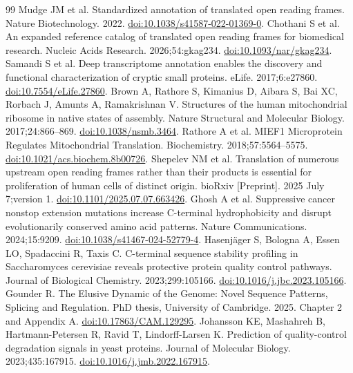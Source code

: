 \documentclass[11pt,a4paper]{article}
\begin{document}
\begingroup\small
\begin{thebibliography}{99}
 Mudge JM et al. Standardized annotation of translated open reading frames. Nature Biotechnology. 2022. \href{https://doi.org/10.1038/s41587-022-01369-0}{doi:10.1038/s41587-022-01369-0}.
 Chothani S et al. An expanded reference catalog of translated open reading frames for biomedical research. Nucleic Acids Research. 2026;54:gkag234. \href{https://doi.org/10.1093/nar/gkag234}{doi:10.1093/nar/gkag234}.
 Samandi S et al. Deep transcriptome annotation enables the discovery and functional characterization of cryptic small proteins. eLife. 2017;6:e27860. \href{https://doi.org/10.7554/eLife.27860}{doi:10.7554/eLife.27860}.
 Brown A, Rathore S, Kimanius D, Aibara S, Bai XC, Rorbach J, Amunts A, Ramakrishnan V. Structures of the human mitochondrial ribosome in native states of assembly. Nature Structural and Molecular Biology. 2017;24:866--869. \href{https://doi.org/10.1038/nsmb.3464}{doi:10.1038/nsmb.3464}.
 Rathore A et al. MIEF1 Microprotein Regulates Mitochondrial Translation. Biochemistry. 2018;57:5564--5575. \href{https://doi.org/10.1021/acs.biochem.8b00726}{doi:10.1021/acs.biochem.8b00726}.
 Shepelev NM et al. Translation of numerous upstream open reading frames rather than their products is essential for proliferation of human cells of distinct origin. bioRxiv [Preprint]. 2025 July 7;version 1. \href{https://doi.org/10.1101/2025.07.07.663426}{doi:10.1101/2025.07.07.663426}.
 Ghosh A et al. Suppressive cancer nonstop extension mutations increase C-terminal hydrophobicity and disrupt evolutionarily conserved amino acid patterns. Nature Communications. 2024;15:9209. \href{https://doi.org/10.1038/s41467-024-52779-4}{doi:10.1038/s41467-024-52779-4}.
 Hasenj{\"a}ger S, Bologna A, Essen LO, Spadaccini R, Taxis C. C-terminal sequence stability profiling in Saccharomyces cerevisiae reveals protective protein quality control pathways. Journal of Biological Chemistry. 2023;299:105166. \href{https://doi.org/10.1016/j.jbc.2023.105166}{doi:10.1016/j.jbc.2023.105166}.
 Gounder R. The Elusive Dynamic of the Genome: Novel Sequence Patterns, Splicing and Regulation. PhD thesis, University of Cambridge. 2025. Chapter 2 and Appendix A. \href{https://doi.org/10.17863/CAM.129295}{doi:10.17863/CAM.129295}.
 Johansson KE, Mashahreh B, Hartmann-Petersen R, Ravid T, Lindorff-Larsen K. Prediction of quality-control degradation signals in yeast proteins. Journal of Molecular Biology. 2023;435:167915. \href{https://doi.org/10.1016/j.jmb.2022.167915}{doi:10.1016/j.jmb.2022.167915}.

\end{thebibliography}
\end{document}
